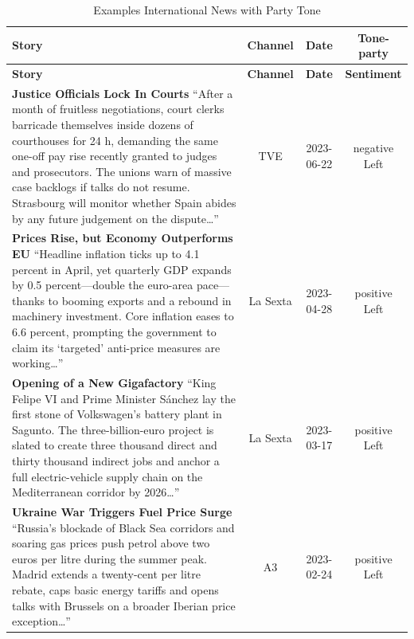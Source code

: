 \documentclass[12pt]{article}
\begin{document}
\label{tab:examples_stories}


\begin{center}


\begin{longtable}{|p{8cm}|c|c|c|}
\caption{Examples International News with Party Tone}\\
	\hline
	\textbf{Story} & \textbf{Channel} & \textbf{Date} & \textbf{Tone-party} \\
	\hline
	\endfirsthead
	\hline
	\textbf{Story} & \textbf{Channel} & \textbf{Date} & \textbf{Sentiment} \\
	\hline
	\endhead
	
	\textbf{Justice Officials Lock In Courts}\newline
	{\scriptsize“After a month of fruitless negotiations, court clerks barricade themselves inside dozens of courthouses for 24 h, demanding the same one-off pay rise recently granted to judges and prosecutors.  The unions warn of massive case backlogs if talks do not resume.  Strasbourg will monitor whether Spain abides by any future judgement on the dispute…”}
	& TVE & 2023-06-22 & negative Left\\
	\hline
	
	\textbf{Prices Rise, but Economy Outperforms EU}\newline
	{\scriptsize“Headline inflation ticks up to 4.1 percent in April, yet quarterly GDP expands by 0.5 percent—double the euro-area pace—thanks to booming exports and a rebound in machinery investment.  Core inflation eases to 6.6 percent, prompting the government to claim its ‘targeted’ anti-price measures are working…”}
	& La Sexta & 2023-04-28 & positive Left\\
	\hline
	
	\textbf{Opening of a New Gigafactory }\newline
	{\scriptsize“King Felipe VI and Prime Minister Sánchez lay the first stone of Volkswagen’s battery plant in Sagunto.  The three-billion-euro project is slated to create three thousand direct and thirty thousand indirect jobs and anchor a full electric-vehicle supply chain on the Mediterranean corridor by 2026…”}
	& La Sexta & 2023-03-17 & positive Left\\
	\hline
	
	\textbf{Ukraine War Triggers Fuel Price Surge}\newline
	{\scriptsize“Russia’s blockade of Black Sea corridors and soaring gas prices push petrol above two euros per litre during the summer peak.  Madrid extends a twenty-cent per litre rebate, caps basic energy tariffs and opens talks with Brussels on a broader Iberian price exception…”}
	& A3 & 2023-02-24 & positive Left\\
	\hline
	

\end{longtable}
\end{center}
\end{document}
